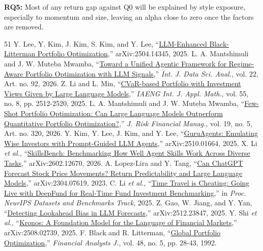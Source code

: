 \documentclass[conference]{IEEEtran}
\begin{document}
\noindent\textbf{RQ5:} Most of any return gap against Q0 will be explained by style exposure, especially to momentum and size, leaving an alpha close to zero once the factors are removed.

{\footnotesize\setlength{\itemsep}{0pt}
\begin{thebibliography}{51}
\setlength{\itemsep}{0pt}\setlength{\parskip}{0pt}
 Y. Lee, Y. Kim, J. Kim, S. Kim, and Y. Lee, ``\href{https://arxiv.org/abs/2504.14345}{LLM-Enhanced Black-Litterman Portfolio Optimization},'' arXiv:2504.14345, 2025.
 L. A. Mantshimuli and J. W. Muteba Mwamba, ``\href{https://link.springer.com/article/10.1007/s41060-026-01066-0}{Toward a Unified Agentic Framework for Regime-Aware Portfolio Optimization with LLM Signals},'' \textit{Int. J. Data Sci. Anal.}, vol. 22, Art. no. 92, 2026.
 Z. Li and L. Min, ``\href{https://www.iaeng.org/IJAM/issues_v55/issue_8/IJAM_55_8_21.pdf}{CVaR-based Portfolio with Investment Views Given by Large Language Models},'' \textit{IAENG Int. J. Appl. Math.}, vol. 55, no. 8, pp. 2512-2520, 2025.
 L. A. Mantshimuli and J. W. Muteba Mwamba, ``\href{https://www.mdpi.com/1911-8074/19/5/320}{Few-Shot Portfolio Optimization: Can Large Language Models Outperform Quantitative Portfolio Optimization?},'' \textit{J. Risk Financial Manag.}, vol. 19, no. 5, Art. no. 320, 2026.
 Y. Kim, Y. Lee, J. Kim, and Y. Lee, ``\href{https://arxiv.org/abs/2510.01664}{GuruAgents: Emulating Wise Investors with Prompt-Guided LLM Agents},'' arXiv:2510.01664, 2025.
 X. Li \textit{et al.}, ``\href{https://arxiv.org/abs/2602.12670}{SkillsBench: Benchmarking How Well Agent Skills Work Across Diverse Tasks},'' arXiv:2602.12670, 2026.
 A. Lopez-Lira and Y. Tang, ``\href{https://arxiv.org/abs/2304.07619}{Can ChatGPT Forecast Stock Price Movements? Return Predictability and Large Language Models},'' arXiv:2304.07619, 2023.
 C. Li \textit{et al.}, ``\href{https://arxiv.org/abs/2505.11065}{Time Travel is Cheating: Going Live with DeepFund for Real-Time Fund Investment Benchmarking},'' in \textit{Proc. NeurIPS Datasets and Benchmarks Track}, 2025.
 Z. Gao, W. Jiang, and Y. Yan, ``\href{https://arxiv.org/abs/2512.23847}{Detecting Lookahead Bias in LLM Forecasts},'' arXiv:2512.23847, 2025.
 Y. Shi \textit{et al.}, ``\href{https://arxiv.org/abs/2508.02739}{Kronos: A Foundation Model for the Language of Financial Markets},'' arXiv:2508.02739, 2025.
 F. Black and R. Litterman, ``\href{https://people.duke.edu/~charvey/Teaching/BA453_2006/Black_Litterman_Global_Portfolio_Optimization_1992.pdf}{Global Portfolio Optimization},'' \textit{Financial Analysts J.}, vol. 48, no. 5, pp. 28-43, 1992.

\end{thebibliography}}
\end{document}
